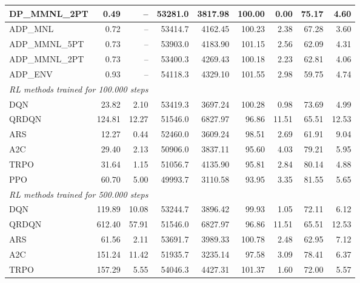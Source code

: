 \begin{samepage}
\begin{center}
\begin{tabular}{l|rr|rr|rr|rr}
    DP\_MMNL\_2PT &     0.49 &    -- &    53281.0 &    3817.98 &  100.00 &    0.00 &   75.17 &    4.60 \\
    \midrule
    ADP\_MNL     &     0.72 &    -- &    53414.7 &    4162.45 &  100.23 &    2.38 &   67.28 &    3.60 \\
    ADP\_MMNL\_5PT &     0.73 &    -- &    53903.0 &    4183.90 &  101.15 &    2.56 &   62.09 &    4.31 \\
    ADP\_MMNL\_2PT &     0.73 &    -- &    53400.3 &    4269.43 &  100.18 &    2.23 &   62.81 &    4.06 \\
    ADP\_ENV     &     0.93 &    -- &    54118.3 &    4329.10 &  101.55 &    2.98 &   59.75 &    4.74 \\
    \midrule
    \multicolumn{9}{l}{\textit{RL methods trained for 100.000 steps}} \\
    \midrule
    DQN          &    23.82 &     2.10 &    53419.3 &    3697.24 &  100.28 &    0.98 &   73.69 &    4.99 \\
    QRDQN        &   124.81 &    12.27 &    51546.0 &    6827.97 &   96.86 &   11.51 &   65.51 &   12.53 \\
    ARS          &    12.27 &     0.44 &    52460.0 &    3609.24 &   98.51 &    2.69 &   61.91 &    9.04 \\
    A2C          &    29.40 &     2.13 &    50906.0 &    3837.11 &   95.60 &    4.03 &   79.21 &    5.95 \\
    TRPO         &    31.64 &     1.15 &    51056.7 &    4135.90 &   95.81 &    2.84 &   80.14 &    4.88 \\
    PPO          &    60.70 &     5.00 &    49993.7 &    3110.58 &   93.95 &    3.35 &   81.55 &    5.65 \\
    \midrule
    \multicolumn{9}{l}{\textit{RL methods trained for 500.000 steps}} \\
    \midrule
    DQN          &   119.89 &    10.08 &    53244.7 &    3896.42 &   99.93 &    1.05 &   72.11 &    6.12 \\
    QRDQN        &   612.40 &    57.91 &    51546.0 &    6827.97 &   96.86 &   11.51 &   65.51 &   12.53 \\
    ARS          &    61.56 &     2.11 &    53691.7 &    3989.33 &  100.78 &    2.48 &   62.95 &    7.12 \\
    A2C          &   151.24 &    11.42 &    51935.7 &    3235.14 &   97.58 &    3.09 &   78.41 &    6.37 \\
    TRPO         &   157.29 &     5.55 &    54046.3 &    4427.31 &  101.37 &    1.60 &   72.00 &    5.57 \\

\end{tabular}
\end{center}
\end{samepage}
